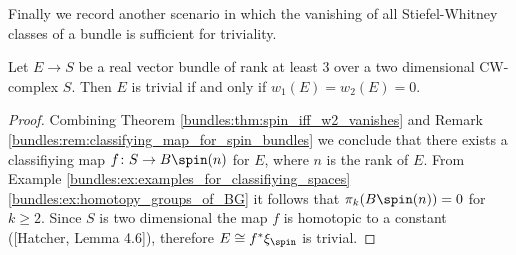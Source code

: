 Finally we record another scenario in which the vanishing of all Stiefel-Whitney classes of a bundle is sufficient for triviality.

\begin{lemma}
    \label{bundles:lem:criterion_for_triviality}
    Let $E \to S$ be a real vector bundle of rank at least $3$ over a two dimensional CW-complex $S$. Then $E$ is trivial if and only if $w_1(E) = w_2(E) = 0$.
\end{lemma}

\begin{proof}
    Combining Theorem \ref{bundles:thm:spin_iff_w2_vanishes} and Remark \ref{bundles:rem:classifying_map_for_spin_bundles} we conclude that there exists a classifiying map $f \colon S \to B\spin(n)$ for $E$, where $n$ is the rank of $E$. From Example \ref{bundles:ex:examples_for_classifiying_spaces} \ref{bundles:ex:homotopy_groups_of_BG} it follows that $\pi_k(B\spin(n)) = 0$ for $k \geq 2$. Since $S$ is two dimensional the map $f$ is homotopic to a constant ([Hatcher, Lemma 4.6]), therefore $E \cong f^\ast \xi_\spin$ is trivial.
\end{proof}